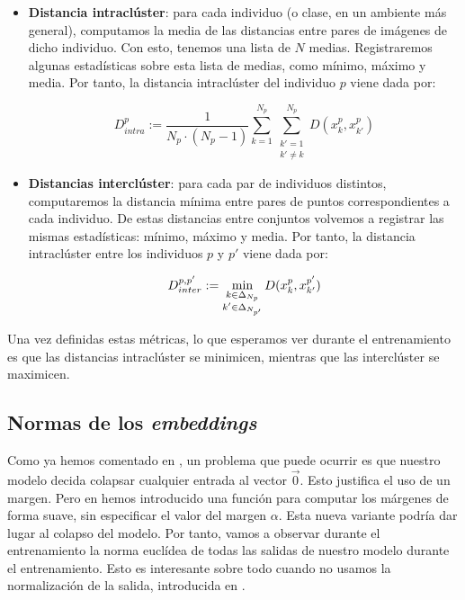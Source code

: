 \begin{itemize}
    \item \textbf{Distancia intraclúster}: para cada individuo (o clase, en un ambiente más general), computamos la media de las distancias entre pares de imágenes de dicho individuo. Con esto, tenemos una lista de $N$ medias. Registraremos algunas estadísticas sobre esta lista de medias, como mínimo, máximo y media. Por tanto, la distancia intraclúster del individuo $p$ viene dada por:

    \begin{equation}
        D_{intra}^p := \frac{1}{N_p \cdot (N_p - 1)} \sum_{k = 1}^{N_p} \sum_{\substack{k' = 1 \\ k' \neq k}}^{N_p} D(x_k^p, x_{k'}^p)
    \end{equation}

    \item \textbf{Distancias interclúster}: para cada par de individuos distintos, computaremos la distancia mínima entre pares de puntos correspondientes a cada individuo. De estas distancias entre conjuntos volvemos a registrar las mismas estadísticas: mínimo, máximo y media. Por tanto, la distancia intraclúster entre los individuos $p$ y $p'$ viene dada por:

    \begin{equation}
        D_{inter}^{p, p'} := \min_{\substack{k \in \Delta_{N_p} \\ k' \in \Delta_{N_{p'}}}}{D(x_k^p, x_{k'}^{p'})}
    \end{equation}
\end{itemize}

Una vez definidas estas métricas, lo que esperamos ver durante el entrenamiento es que las distancias intraclúster se minimicen, mientras que las interclúster se maximicen.

\subsection{Normas de los \textit{embeddings}} \label{isubs:normas_embeddings}

Como ya hemos comentado en , un problema que puede ocurrir es que nuestro modelo decida colapsar cualquier entrada al vector $\vec{0}$. Esto justifica el uso de un margen. Pero en  hemos introducido una función para computar los márgenes de forma suave, sin especificar el valor del margen $\alpha$. Esta nueva variante podría dar lugar al colapso del modelo. Por tanto, vamos a observar durante el entrenamiento la norma euclídea de todas las salidas de nuestro modelo durante el entrenamiento. Esto es interesante sobre todo cuando no usamos la normalización de la salida, introducida en .

